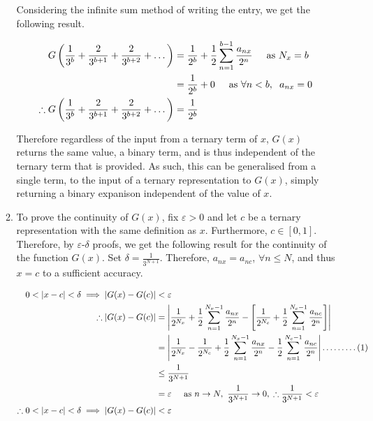 \documentclass[a4paper]{article}
\begin{document}
\begin{enumerate}[label=\textbf{\arabic*.}]
\begin{enumerate}
		Considering the infinite sum method of writing the entry, we get the following result.

		\begin{align*}
		G\left(\frac{1}{3^b} + \frac{2}{3^{b+1}} + \frac{2}{3^{b+2}} + \dots\right) & = \frac{1}{2^b} + \frac{1}{2}\sum_{n=1}^{b-1}\frac{a_{nx}}{2^n} \hspace{5mm} \text{as } N_x = b\\
		& = \frac{1}{2^b} + 0 \hspace{5mm} \text{as } \forall n < b, \hspace{2mm} a_{nx} = 0\\
		\therefore G\left(\frac{1}{3^b} + \frac{2}{3^{b+1}} + \frac{2}{3^{b+2}} + \dots\right) & = \frac{1}{2^b}\\
		\end{align*}

		Therefore regardless of the input from a ternary term of $x$, $G(x)$ returns the same value, a binary term, and is thus independent of the ternary term that is provided. As such, this can be generalised from a single term, to the input of a ternary representation to $G(x)$, simply returning a binary expanison independent of the value of $x$.

		\bigbreak

		\item To prove the continuity of $G(x)$, fix $\varepsilon > 0$ and let $c$ be a ternary representation with the same definition as $x$. Furthermore, $c \in [0,1]$. Therefore, by $\varepsilon$-$\delta$ proofs, we get the following result for the continuity of the function $G(x)$. Set $\displaystyle{\delta = \frac{1}{3^{N+1}}}$. Therefore, $a_{nx} = a_{nc}$, $\forall n\leq N$, and thus $x = c$ to a sufficient accuracy.

		\begin{align*}
		0 < |x - c| < \delta \implies \left|G(x) - G(c)\right| & < \varepsilon\\
		\therefore \left|G(x) - G(c)\right| & = \left|\frac{1}{2^{N_x}} + \frac{1}{2}\sum_{n=1}^{N_x-1}\frac{a_{nx}}{2^{n}} - \left[\frac{1}{2^{N_c}} + \frac{1}{2}\sum_{n=1}^{N_c-1}\frac{a_{nc}}{2^{n}}\right]\right|\\
		& = \left|\frac{1}{2^{N_x}} - \frac{1}{2^{N_c}} + \frac{1}{2}\sum_{n=1}^{N_x-1}\frac{a_{nx}}{2^{n}} - \frac{1}{2}\sum_{n=1}^{N_c-1}\frac{a_{nc}}{2^{n}}\right| \dots\dots\dots(1)\\
		& \leq \frac{1}{3^{N+1}}\\
		& = \varepsilon \hspace{5mm} \text{as } n \rightarrow N, \text{ } \frac{1}{3^{N+1}} \rightarrow 0, \text{} \therefore \frac{1}{3^{N+1}} < \varepsilon\\
		\therefore 0 < |x - c| < \delta \implies \left|G(x) - G(c)\right| & < \varepsilon\\
		\end{align*}


\end{enumerate}
\end{enumerate}
\end{document}
